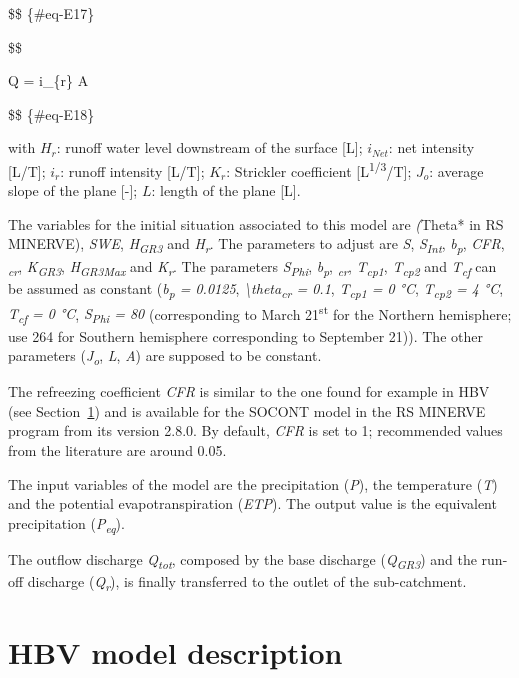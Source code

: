 \documentclass[
  letterpaper,
  DIV=11,
  numbers=noendperiod]{scrreprt}
\begin{document}
\$\$ \{\#eq-E17\}

\$\$

Q = i\_\{r\} \cdot A

\$\$ \{\#eq-E18\}

with \(H_r\): runoff water level downstream of the surface {[}L{]};
\(i_{Net}\): net intensity {[}L/T{]}; \(i_r\): runoff intensity
{[}L/T{]}; \(K_r\): Strickler coefficient
{[}L\textsuperscript{1/3}/T{]}; \(J_o\): average slope of the plane
{[}-{]}; \(L\): length of the plane {[}L{]}.

The variables for the initial situation associated to this model are
\emph{\theta* (}Theta* in RS MINERVE), \emph{SWE},
\emph{H\textsubscript{GR3}} and \emph{H\textsubscript{r}}. The
parameters to adjust are \emph{S}, \emph{S\textsubscript{Int}},
\emph{b\textsubscript{p}}, \emph{CFR}, \emph{\theta\textsubscript{cr}},
\emph{K\textsubscript{GR3}}, \emph{H\textsubscript{GR3Max}} and
\emph{K\textsubscript{r}}. The parameters \emph{S\textsubscript{Phi}},
\emph{b\textsubscript{p}}, \emph{\theta\textsubscript{cr}},
\emph{T\textsubscript{cp1}}, \emph{T\textsubscript{cp2}} and
\emph{T\textsubscript{cf}} can be assumed as constant
(\emph{b\textsubscript{p} = 0.0125},
\emph{\textbackslash theta\textsubscript{cr} = 0.1},
\emph{T\textsubscript{cp1} = 0 °C}, \emph{T\textsubscript{cp2} = 4 °C},
\emph{T\textsubscript{cf} = 0 °C}, \emph{S\textsubscript{Phi} = 80}
(corresponding to March 21\textsuperscript{st} for the Northern
hemisphere; use 264 for Southern hemisphere corresponding to September
21)). The other parameters (\emph{J\textsubscript{o}}, \emph{L},
\emph{A}) are supposed to be constant.

The refreezing coefficient \emph{CFR} is similar to the one found for
example in HBV (see Section~\ref{sec-model_hbv}) and is available for
the SOCONT model in the RS MINERVE program from its version 2.8.0. By
default, \emph{CFR} is set to 1; recommended values from the literature
are around 0.05.

The input variables of the model are the precipitation (\emph{P}), the
temperature (\emph{T}) and the potential evapotranspiration
(\emph{ETP}). The output value is the equivalent precipitation
(\emph{P\textsubscript{eq}}).

The outflow discharge \emph{Q\textsubscript{tot}}, composed by the base
discharge (\emph{Q\textsubscript{GR3}}) and the run-off discharge
(\emph{Q\textsubscript{r}}), is finally transferred to the outlet of the
sub-catchment.

\hypertarget{sec-model_hbv}{%
\chapter{HBV model description}\label{sec-model_hbv}}
\end{document}

